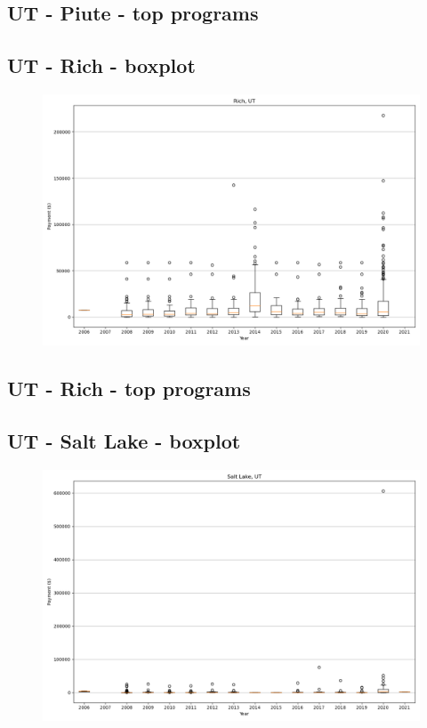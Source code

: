 \subsection*{UT - Piute - top programs}

\newpage
\subsection*{UT - Rich - boxplot}
\begin{figure}[h]
\centering
\includegraphics[width=7in]{../output/boxplots/counties/Rich-UT_boxplot.png}
\end{figure}


\subsection*{UT - Rich - top programs}

\newpage
\subsection*{UT - Salt Lake - boxplot}
\begin{figure}[h]
\centering
\includegraphics[width=7in]{../output/boxplots/counties/Salt Lake-UT_boxplot.png}
\end{figure}


